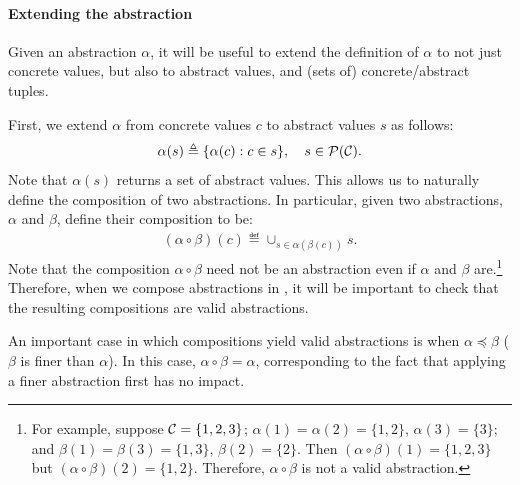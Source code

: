 \paragraph{Extending the abstraction}

Given an abstraction $\alpha$, it will be useful to extend the definition of
$\alpha$ to not just concrete values, but also to abstract values,
and (sets of) concrete/abstract tuples.

First, we extend $\alpha$ from concrete values $c$ to abstract values $s$ as follows:
\begin{align}
\alpha(s) \triangleq \{ \alpha(c) : c \in s \}, \quad s \in \mathcal{P}(\mathcal{C}).
\end{align}
Note that $\alpha(s)$ returns a set of abstract values.
This allows us to naturally define the composition of two abstractions.
In particular, given two abstractions, $\alpha$ and $\beta$,
define their composition to be:
\begin{align}
(\alpha \circ \beta)(c) \eqdef \cup_{s \in \alpha(\beta(c))} s.
\end{align}
Note that the composition $\alpha \circ \beta$ need not be an abstraction
even if $\alpha$ and $\beta$ are.\footnote{For example,
suppose $\mathcal{C} = \{1,2,3\}$;
$\alpha(1) = \alpha(2) = \{1,2\}$, $\alpha(3) = \{ 3 \}$; and
$\beta(1) = \beta(3) = \{1,3\}$, $\beta(2) = \{ 2 \}$.
Then $(\alpha \circ \beta)(1) = \{1,2,3\}$ but $(\alpha \circ \beta)(2) = \{1,2\}$.
Therefore, $\alpha \circ \beta$ is not a valid abstraction.
}
Therefore, when we compose abstractions in ,
it will be important to check that the resulting compositions are valid abstractions.

An important case in which compositions yield valid abstractions
is when $\alpha \preceq \beta$ ($\beta$ is finer than $\alpha$).
In this case, $\alpha \circ \beta = \alpha$,
corresponding to the fact that
applying a finer abstraction first has no impact.

